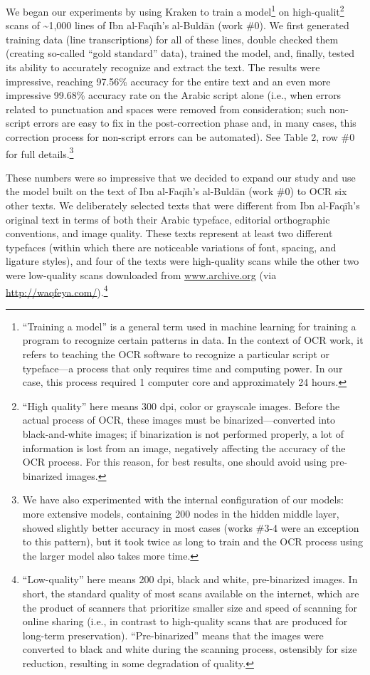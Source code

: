 We began our experiments by using Kraken to train a model\footnote{“Training a
model” is a general term used in machine learning for training a program to
recognize certain patterns in data. In the context of OCR work, it refers to
teaching the OCR software to recognize a particular script or typeface—a
process that only requires time and computing power. In our case, this process
required 1 computer core and approximately 24 hours.} on
high-qualit\footnote{“High quality” here means 300 dpi, color or grayscale
images. Before the actual process of OCR, these images must be
binarized—converted into black-and-white images; if binarization is not
performed properly, a lot of information is lost from an image, negatively
affecting the accuracy of the OCR process. For this reason, for best results,
one should avoid using pre-binarized images.} scans of \textasciitilde1,000 lines of
Ibn al-Faqīh’s al-Buldān (work \#0). We first generated training data (line
transcriptions) for all of these lines, double checked them (creating so-called
“gold standard” data), trained the model, and, finally,
tested its ability to accurately recognize and extract the text. The results
were impressive, reaching 97.56\% accuracy for the entire text and an even more
impressive 99.68\% accuracy rate on the Arabic script alone (i.e., when errors
related to punctuation and spaces were removed from consideration; such
non-script errors are easy to fix in the post-correction phase and, in many
cases, this correction process for non-script errors can be automated). See
Table 2, row \#0 for full details.\footnote{We have also experimented with the
internal configuration of our models: more extensive models, containing 200
nodes in the hidden middle layer, showed slightly better accuracy in most cases
(works \#3-4 were an exception to this pattern), but it took twice as long to
train and the OCR process using the larger model also takes more time.}

These numbers were so impressive that we decided to expand our study and use
the model built on the text of Ibn al-Faqīh’s al-Buldān (work \#0) to OCR six
other texts. We deliberately selected texts that were different from Ibn
al-Faqīh’s original text in terms of both their Arabic typeface, editorial
orthographic conventions, and image quality. These texts represent at least two
different typefaces (within which there are noticeable variations of font,
spacing, and ligature styles), and four of the texts were high-quality scans
while the other two were low-quality scans downloaded from
\url{www.archive.org} (via \url{http://waqfeya.com/}).\footnote{“Low-quality”
here means 200 dpi, black and white, pre-binarized images. In short, the
standard quality of most scans available on the internet, which are the product
of scanners that prioritize smaller size and speed of scanning for online
sharing (i.e., in contrast to high-quality scans that are produced for
long-term preservation). “Pre-binarized” means that the  images were converted
to black and white during the scanning process, ostensibly for size reduction,
resulting in some degradation of quality.}

